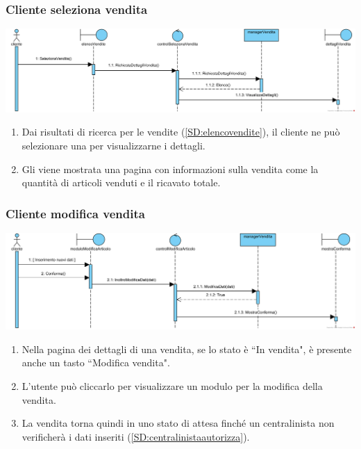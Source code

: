 \documentclass[12pt,a4paper]{article}
\begin{document}
\subsubsection{Cliente seleziona vendita}
\label{SD:selezionavenditacliente}

\begin{center}
\includegraphics[width=\textwidth]{SequenceDiagram/ClienteVenditaSeleziona}
\end{center}

\begin{enumerate}
\item Dai risultati di ricerca per le vendite (\ref{SD:elencovendite}), il cliente ne può selezionare una per visualizzarne i dettagli.
\item Gli viene mostrata una pagina con informazioni sulla vendita come la quantità di articoli venduti e il ricavato totale.
\end{enumerate}

\subsubsection{Cliente modifica vendita}
\label{SD:modificavendita}

\begin{center}
\includegraphics[width=\textwidth]{SequenceDiagram/ClienteVenditaModifica}
\end{center}

\begin{enumerate}
\item Nella pagina dei dettagli di una vendita, se lo stato è ``In vendita", è presente anche un tasto ``Modifica vendita".
\item L'utente può cliccarlo per visualizzare un modulo per la modifica della vendita. 
\item La vendita torna quindi in uno stato di attesa finché un centralinista non verificherà i dati inseriti (\ref{SD:centralinistaautorizza}).
\end{enumerate}
\end{document}
